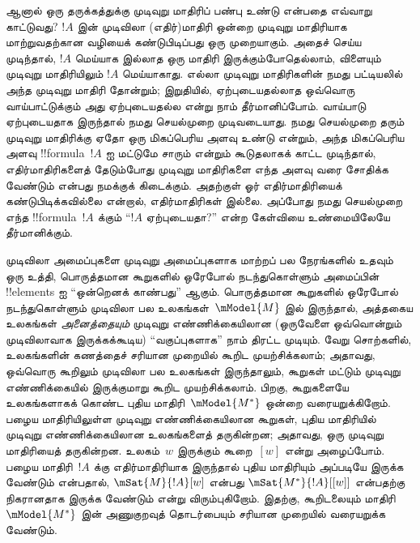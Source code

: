 \documentclass[../../../include/open-logic-section]{subfiles}
\begin{document}
ஆனால் ஒரு தருக்கத்துக்கு முடிவுறு மாதிரிப் பண்பு உண்டு என்பதை எவ்வாறு
காட்டுவது? $!A$ இன் முடிவிலா (எதிர்)மாதிரி ஒன்றை முடிவுறு மாதிரியாக
மாற்றுவதற்கான வழியைக் கண்டுபிடிப்பது ஒரு முறையாகும். அதைச் செய்ய முடிந்தால்,
$!A$ மெய்யாக இல்லாத ஒரு மாதிரி இருக்கும்போதெல்லாம், விளையும் முடிவுறு
மாதிரியிலும் $!A$ மெய்யாகாது. எல்லா முடிவுறு மாதிரிகளின் நமது பட்டியலில்
அந்த முடிவுறு மாதிரி தோன்றும்; இறுதியில், ஏற்புடையதல்லாத ஒவ்வொரு
வாய்பாட்டுக்கும் அது ஏற்புடையதல்ல என்று நாம் தீர்மானிப்போம். வாய்பாடு
ஏற்புடையதாக இருந்தால் நமது செயல்முறை முடிவடையாது. நமது செயல்முறை தரும்
முடிவுறு மாதிரிக்கு ஏதோ ஒரு மிகப்பெரிய அளவு உண்டு என்றும், அந்த மிகப்பெரிய
அளவு !!{formula}~$!A$ ஐ மட்டுமே சாரும் என்றும் கூடுதலாகக் காட்ட முடிந்தால்,
எதிர்மாதிரிகளைத் தேடும்போது முடிவுறு மாதிரிகளை எந்த அளவு வரை சோதிக்க வேண்டும்
என்பது நமக்குக் கிடைக்கும். அதற்குள் ஓர் எதிர்மாதிரியைக் கண்டுபிடிக்கவில்லை
என்றால், எதிர்மாதிரிகள் இல்லை. அப்போது நமது செயல்முறை எந்த
!!{formula}~$!A$ க்கும் ``$!A$ ஏற்புடையதா?'' என்ற கேள்வியை உண்மையிலேயே
தீர்மானிக்கும்.

முடிவிலா அமைப்புகளை முடிவுறு அமைப்புகளாக மாற்றப் பல நேரங்களில் உதவும் ஒரு
உத்தி, பொருத்தமான கூறுகளில் ஒரேபோல் நடந்துகொள்ளும் அமைப்பின் !!{element}s ஐ
``ஒன்றெனக் காண்பது'' ஆகும். பொருத்தமான கூறுகளில் ஒரேபோல் நடந்துகொள்ளும்
முடிவிலா பல உலகங்கள்~$\mModel{M}$ இல் இருந்தால், அத்தகைய உலகங்கள்
\emph{அனைத்தையும்} முடிவுறு எண்ணிக்கையிலான (ஒருவேளை ஒவ்வொன்றும் முடிவிலாவாக
இருக்கக்கூடிய) ``வகுப்புகளாக'' நாம் திரட்ட முடியும். வேறு சொற்களில்,
உலகங்களின் கணத்தைச் சரியான முறையில் கூறிட முயற்சிக்கலாம்; அதாவது, ஒவ்வொரு
கூறிலும் முடிவிலா பல உலகங்கள் இருந்தாலும், கூறுகள் மட்டும் முடிவுறு
எண்ணிக்கையில் இருக்குமாறு கூறிட முயற்சிக்கலாம். பிறகு, கூறுகளையே உலகங்களாகக்
கொண்ட புதிய மாதிரி~$\mModel{M^*}$ ஒன்றை வரையறுக்கிறோம். பழைய மாதிரியிலுள்ள
முடிவுறு எண்ணிக்கையிலான கூறுகள், புதிய மாதிரியில் முடிவுறு எண்ணிக்கையிலான
உலகங்களைத் தருகின்றன; அதாவது, ஒரு முடிவுறு மாதிரியைத் தருகின்றன. உலகம்~$w$
இருக்கும் கூறை~$[w]$ என்று அழைப்போம். பழைய மாதிரி~$!A$ க்கு எதிர்மாதிரியாக
இருந்தால் புதிய மாதிரியும் அப்படியே இருக்க வேண்டும் என்பதால்,
$\mSat{M}{!A}[w]$ என்பது $\mSat{M^*}{!A}[{[w]}]$ என்பதற்கு நிகரானதாக
இருக்க வேண்டும் என்று விரும்புகிறோம். இதற்கு, கூறிடலையும்
மாதிரி~$\mModel{M^*}$ இன் அணுகுறவுத் தொடர்பையும் சரியான முறையில் வரையறுக்க
வேண்டும்.
\end{document}

